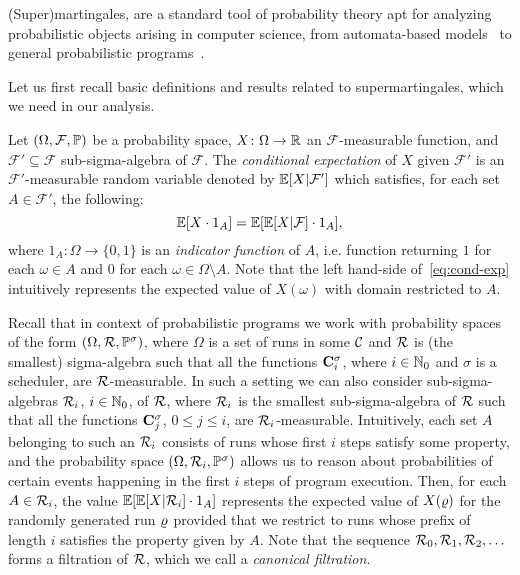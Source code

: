 (Super)martingales, are a standard tool of 
probability theory apt for analyzing probabilistic objects arising in computer 
science, from automata-based models~\cite{BKKNK:pMC-zero-reachability} to 
general probabilistic 
programs~\cite{SriramCAV,HolgerPOPL,CFNH16:prob-termination,CFG16:positivstellensatz-arxiv,BEFH16:doob-decomposition}.
 
Let us first recall basic
definitions and results related to supermartingales, which we need in our 
analysis.

\smallskip{} 
Let $(\Omega,\mathcal{F},\mathbb{P})$ be a probability space, 
$X\colon\Omega\rightarrow 
\mathbb{R}$ an $\mathcal{F}$-measurable function, and $\mathcal{F}'\subseteq 
\mathcal{F}$ sub-sigma-algebra of $\mathcal{F}$. The \emph{conditional 
expectation} of $X$ given $\mathcal{F}'$ is an $\mathcal{F}'$-measurable random 
variable denoted by $\mathbb{E}[X| \mathcal{F}']$ which satisfies, for each set $A\in 
\mathcal{F}'$, the following: 
\begin{equation}
\label{eq:cond-exp}
\mathbb{E}[X\cdot 1_A] = \mathbb{E}[\mathbb{E}[X|\mathcal{F}]\cdot 1_A],
\end{equation}
where $1_A \colon \Omega\rightarrow \{0,1\}$ is an \emph{indicator function} of 
$A$, i.e. function returning $1$ for 
each $\omega\in A$ and $0$ for each $\omega\in \Omega\setminus A$. Note that 
the left hand-side of~\eqref{eq:cond-exp} intuitively represents the expected 
value 
of $X(\omega)$ with domain restricted to $A$.

Recall that in context of probabilistic programs we work with probability 
spaces of the form $(\Omega,\mathcal{R},\mathbb{P}^\sigma)$, where $\Omega$ is a 
set of runs in some $\mathcal{C}$ and $\mathcal{R}$ is (the smallest) sigma-algebra 
such that all the functions $\mathbf{C}^{\sigma}_{i}$, where $i\in \mathbb{N}_0$ and 
$\sigma$ is a scheduler, are $\mathcal{R}$-measurable. In such a setting we can 
also consider sub-sigma-algebras $\mathcal{R}_i$, $i\in \mathbb{N}_0$, of 
$\mathcal{R}$, where $\mathcal{R}_i$ is the smallest sub-sigma-algebra of 
$\mathcal{R}$ such that all the functions $\mathbf{C}^{\sigma}_{j}$, $0\leq j \leq 
i$, are $\mathcal{R}_i$-measurable. Intuitively, each set $A$ belonging to such 
an $\mathcal{R}_i$ consists of runs whose first $i$ steps satisfy some 
property, and the probability space $(\Omega,\mathcal{R}_i,\mathbb{P}^\sigma)$ 
allows us to reason about probabilities of certain events happening in the 
first 
$i$ steps of program execution. 
Then, for each $A\in \mathcal{R}_i$, the 
value $\mathbb{E}[\mathbb{E}[X|\mathcal{R}_i]\cdot 1_A]$ represents the expected value of 
$X(\varrho)$ for the randomly generated run $\varrho$ provided that we restrict to 
runs whose
prefix of length $i$ satisfies the property given by $A$. 
Note that the sequence $\mathcal{R}_0,\mathcal{R}_1,\mathcal{R}_2,\dots$ forms a 
filtration of $\mathcal{R}$, which we call a \emph{canonical filtration}.

